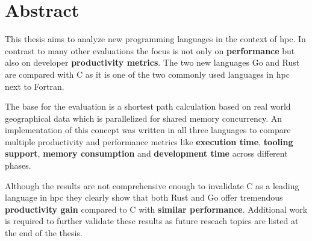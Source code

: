 \chapter*{Abstract}
\label{ch:Abstract}

\thispagestyle{empty}

This thesis aims to analyze new programming languages in the context of \gls{hpc}. In contrast to many other evaluations the focus is not only on \textbf{performance} but also on developer \textbf{productivity metrics}. The two new languages Go and Rust are compared with C as it is one of the two commonly used languages in \gls{hpc} next to Fortran.

The base for the evaluation is a shortest path calculation based on real world geographical data which is parallelized for shared memory concurrency. An implementation of this concept was written in all three languages to compare multiple productivity and performance metrics like \textbf{execution time}, \textbf{tooling support}, \textbf{memory consumption} and \textbf{development time} across different phases.

Although the results are not comprehensive enough to invalidate C as a leading language in \gls{hpc} they clearly show that both Rust and Go offer tremendous \textbf{productivity gain} compared to C with \textbf{similar performance}. Additional work is required to further validate these results as future reseach topics are listed at the end of the thesis.
